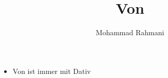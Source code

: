 \documentclass[a4paper]{article}
\title{Von}
\date{}
\author{Mohammad Rahmani}
\begin{document}
\maketitle
    \begin{itemize}
        \item Von ist immer mit Dativ
    \end{itemize}
    
    
    
\end{document}
